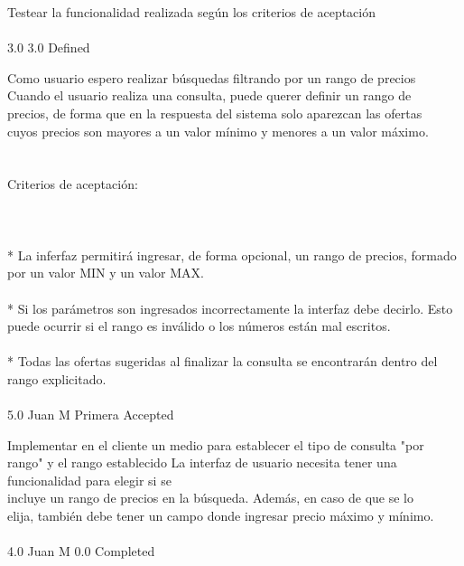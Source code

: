 		{Testear la funcionalidad realizada según los criterios de aceptación} %
		{\\
\\
} %
		{3.0} %
		{} %
		{3.0} %
		{Defined} %


\vspace{20pt}

	{Como usuario espero realizar búsquedas filtrando por un rango de precios} %
	{Cuando el usuario realiza una consulta, puede querer definir un rango de\\
precios, de forma que en la respuesta del sistema solo aparezcan las ofertas\\
cuyos precios son mayores a un valor mínimo y menores a un valor máximo.\\
\\
  \\
Criterios de aceptación:\\
\\
  \\
\\
* La inferfaz permitirá ingresar, de forma opcional, un rango de precios, formado por un valor MIN y un valor MAX.  \\
\\
* Si los parámetros son ingresados incorrectamente la interfaz debe decirlo. Esto puede ocurrir si el rango es inválido o los números están mal escritos.\\
\\
* Todas las ofertas sugeridas al finalizar la consulta se encontrarán dentro del rango explicitado.  \\
\\
} %
	{} %
	{5.0} %
	{Juan M} %
	{Primera} %
	{Accepted} %

		{Implementar en el cliente un medio para establecer el tipo de consulta "por rango" y el rango establecido} %
		{La interfaz de usuario necesita tener una funcionalidad para elegir si se\\
incluye un rango de precios en la búsqueda. Además, en caso de que se lo\\
elija, también debe tener un campo donde ingresar precio máximo y mínimo.\\
\\
} %
		{4.0} %
		{Juan M} %
		{0.0} %
		{Completed} %

